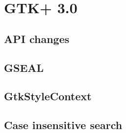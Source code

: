 
\chapter{GTK+ 3.0}


\section{API changes}

\section{GSEAL}

\section{GtkStyleContext}

\section{Case insensitive search}
